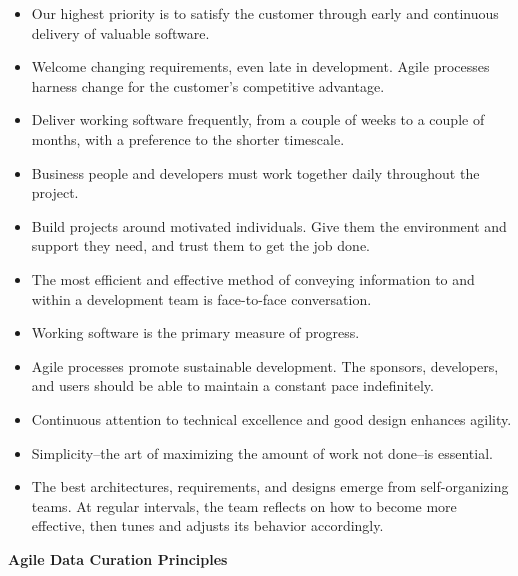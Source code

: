 \documentclass[final]{beamer}
\providecommand{\tightlist}{%
  \setlength{\itemsep}{0pt}\setlength{\parskip}{0pt}}
\begin{document}
\begin{frame}[t]
\begin{multicols}{2}
\begin{itemize}
\tightlist
\item
  Our highest priority is to satisfy the customer through early and
  continuous delivery of valuable software.
\item
  Welcome changing requirements, even late in development. Agile
  processes harness change for the customer's competitive advantage.
\item
  Deliver working software frequently, from a couple of weeks to a
  couple of months, with a preference to the shorter timescale.
\item
  Business people and developers must work together daily throughout the
  project.
\item
  Build projects around motivated individuals. Give them the environment
  and support they need, and trust them to get the job done.
\item
  The most efficient and effective method of conveying information to
  and within a development team is face-to-face conversation.
\item
  Working software is the primary measure of progress.
\item
  Agile processes promote sustainable development. The sponsors,
  developers, and users should be able to maintain a constant pace
  indefinitely.
\item
  Continuous attention to technical excellence and good design enhances
  agility.
\item
  Simplicity--the art of maximizing the amount of work not done--is
  essential.
\item
  The best architectures, requirements, and designs emerge from
  self-organizing teams. At regular intervals, the team reflects on how
  to become more effective, then tunes and adjusts its behavior
  accordingly.
\end{itemize}

\textbf{Agile Data Curation Principles}


\end{multicols}
\end{frame}
\end{document}
